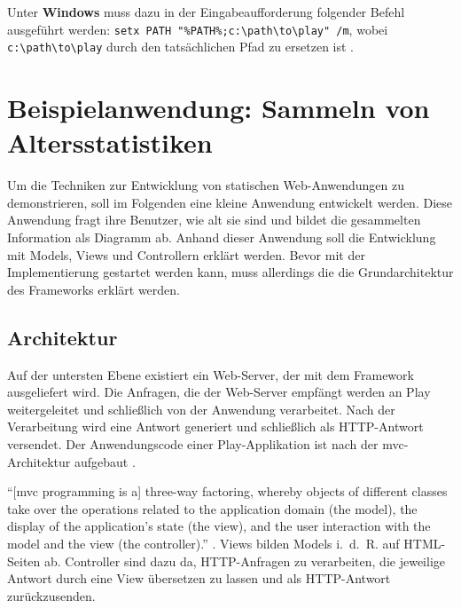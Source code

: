 Unter \textbf{Windows} muss dazu in der Eingabeaufforderung folgender Befehl ausgeführt werden: \lstinline|setx PATH "%PATH%;c:\path\to\play" /m|, wobei \lstinline|c:\path\to\play| durch den tatsächlichen Pfad zu ersetzen ist \cite[vgl.][S.~9]{play_for_scala_v8}.





\section{Beispielanwendung: Sammeln von Altersstatistiken} %
\label{sec:beispielanwendung}

Um die Techniken zur Entwicklung von statischen Web-Anwendungen zu demonstrieren, soll im Folgenden eine kleine Anwendung entwickelt werden.
Diese Anwendung fragt ihre Benutzer, wie alt sie sind und bildet die gesammelten Information als Diagramm ab.
Anhand dieser Anwendung soll die Entwicklung mit Models, Views und Controllern erklärt werden.
Bevor mit der Implementierung gestartet werden kann, muss allerdings die die Grundarchitektur des Frameworks erklärt werden.


\subsection{Architektur} %
\label{sub:architektur}

Auf der untersten Ebene existiert ein Web-Server, der mit dem Framework ausgeliefert wird.
Die Anfragen, die der Web-Server empfängt werden an Play weitergeleitet und schließlich von der Anwendung verarbeitet.
Nach der Verarbeitung wird eine Antwort generiert und schließlich als HTTP-Antwort versendet.
Der Anwendungscode einer Play-Applikation ist nach der \gls{mvc}-Architektur aufgebaut \cite[vgl.][S.~51-53]{play_for_scala_v8}.

"`[\gls{mvc} programming is a] three-way factoring, whereby objects of different classes take over the operations related to the application domain (the model), the display of the application's state (the view), and the user interaction with the model and the view (the controller)."' \cite[vgl.][S.~1]{mvc}.
Views bilden Models i.~d.~R. auf HTML-Seiten ab.
Controller sind dazu da, HTTP-Anfragen zu verarbeiten, die jeweilige Antwort durch eine View übersetzen zu lassen und als HTTP-Antwort zurückzusenden.



